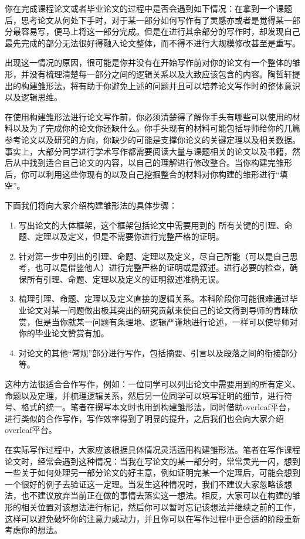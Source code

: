 \documentclass{formatBook}
\begin{document}
你在完成课程论文或者毕业论文的过程中是否会遇到如下情况：在拿到一个课题后，思考论文从何处下手时，对于某一部分如何写作有了灵感亦或者是觉得某一部分最容易写，便马上将这一部分完成。但是在进行其余部分的写作时，却发现自己最先完成的部分无法很好得融入论文整体，而不得不进行大规模修改甚至是重写。\par
出现这一情况的原因，很可能是你并没有在开始写作前对你的论文有一个整体的雏形，并没有梳理清楚每一部分之间的逻辑关系以及大致应该包含的内容。陶哲轩提出的构建雏形法，将有助于你避免上述的问题并且可以培养论文写作时的整体意识以及逻辑思维。\par
在使用构建雏形法进行论文写作前，你必须清楚得了解你手头有哪些可以使用的材料以及为了完成你的论文你还缺什么。你手头现有的材料可能包括导师给你的几篇参考论文以及研究的方向，你缺少的可能是支撑你论文的关键定理以及相关数据。事实上，大部分同学进行学术写作都需要阅读大量与课题相关的论文以及书籍，然后从中找到适合自己论文的内容，以自己的理解进行修改整合。当你构建完雏形后，你可以利用这些你现有的以及自己挖掘整合的材料对你构建的雏形进行“填空”。\par
下面我们将向大家介绍构建雏形法的具体步骤：
\begin{enumerate}
    \item 写出论文的大体框架，这个框架包括论文中需要用到的 所有关键的引理、命题、定理以及定义，但是不需要你进行完整严格的证明。
    \item 针对第一步中列出的引理、命题、定理以及定义，尽自己所能（可以是自己思考，也可以是借鉴他人）进行完整严格的证明或是叙述。进行必要的检查，确保所有引理、命题、定理以及定义的证明叙述准确无误。
    \item 梳理引理、命题、定理以及定义直接的逻辑关系。本科阶段你可能很难通过毕业论文对某一问题做出极其突出的研究贡献来使自己的论文得到导师的青睐欣赏，但是当你就某一问题有条理地、逻辑严谨地进行论述，一样可以使导师对你的毕业论文赞赏有加。
    \item 对论文的其他“常规”部分进行写作，包括摘要、引言以及段落之间的衔接部分等。
\end{enumerate}
\par
这种方法很适合合作写作，例如：一位同学可以列出论文中需要用到的所有定义、命题以及定理，并梳理逻辑关系，然后另一位同学可以填写证明的细节，进行符号、格式的统一。笔者在撰写本文时也用到构建雏形法，同时借助overleaf平台，进行类似的合作写作，写作效率得到了明显的提升，之后我们也会向大家介绍overleaf平台。\par
在实际写作过程中，大家应该根据具体情况灵活运用构建雏形法。笔者在写作课程论文时，经常会遇到这种情况：当我在写论文的某一部分时，常常灵光一闪，想到一些关于如何处理另一部分论文的好主意，例如证明完某一个定理后，可能会想到一个很好的例子去验证这一定理。当发生这种情况时，我们不建议大家忽略该想法，也不建议放弃当前正在做的事情去落实这一想法。相反，大家可以在构建的雏形的相关位置对该想法进行标记，然后你可以暂时忘记该想法并继续之前的工作，这样可以避免破坏你的注意力或动力，并且你可以在写作过程中更合适的阶段重新考虑你的想法。
\end{document}
